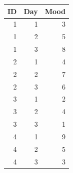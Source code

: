 \documentclass[]{report}\usepackage[]{graphicx}\usepackage[]{color}
\newenvironment{knitrout}{}{} %
\begin{document}
\begin{knitrout}
\color{fgcolor}
\begin{tabular}{r|r|r}
\hline
ID & Day & Mood\\
\hline
1 & 1 & 3\\
\hline
1 & 2 & 5\\
\hline
1 & 3 & 8\\
\hline
2 & 1 & 4\\
\hline
2 & 2 & 7\\
\hline
2 & 3 & 6\\
\hline
3 & 1 & 2\\
\hline
3 & 2 & 4\\
\hline
3 & 3 & 1\\
\hline
4 & 1 & 9\\
\hline
4 & 2 & 5\\
\hline
4 & 3 & 3\\
\hline
\end{tabular}


\end{knitrout}
\end{document}
